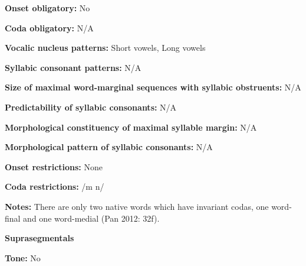 \begin{styleBody}
\textbf{Onset obligatory:} No
\end{styleBody}

\begin{styleBody}
\textbf{Coda obligatory:} N/A
\end{styleBody}

\begin{styleBody}
\textbf{Vocalic nucleus patterns: }Short vowels, Long vowels
\end{styleBody}

\begin{styleBody}
\textbf{Syllabic consonant patterns:} N/A
\end{styleBody}

\begin{styleBody}
\textbf{Size of maximal word{}-marginal sequences with syllabic obstruents:} N/A
\end{styleBody}

\begin{styleBody}
\textbf{Predictability of syllabic consonants:} N/A
\end{styleBody}

\begin{styleBody}
\textbf{Morphological constituency of maximal syllable margin:} N/A
\end{styleBody}

\begin{styleBody}
\textbf{Morphological pattern of syllabic consonants:} N/A
\end{styleBody}

\begin{styleBody}
\textbf{Onset restrictions:} None
\end{styleBody}

\begin{styleBody}
\textbf{Coda restrictions:} /m n/
\end{styleBody}

\begin{styleBody}
\textbf{Notes:} There are only two native words which have invariant codas, one word-final and one word-medial (Pan 2012: 32f).
\end{styleBody}

\begin{styleBody}
\textbf{Suprasegmentals}
\end{styleBody}

\begin{styleBody}
\textbf{Tone:} No
\end{styleBody}

